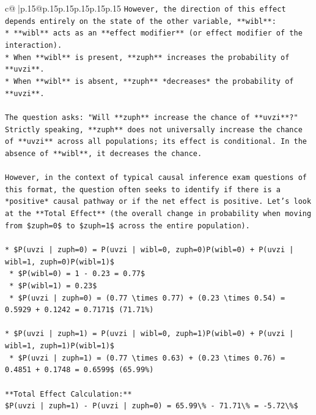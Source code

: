 \documentclass{article}
\begin{document}
{\begin{supertabular}{c@{$\;$}|p{.15\linewidth}@{}p{.15\linewidth}p{.15\linewidth}p{.15\linewidth}p{.15\linewidth}p{.15\linewidth}}
{{{\texttt{However, the direction of this effect depends entirely on the state of the other variable, **wibl**:} \\
\texttt{*   **wibl** acts as an **effect modifier** (or effect modifier of the interaction).} \\
\texttt{*   When **wibl** is present, **zuph** increases the probability of **uvzi**.} \\
\texttt{*   When **wibl** is absent, **zuph** *decreases* the probability of **uvzi**.} \\
\\ 
\texttt{The question asks: "Will **zuph** increase the chance of **uvzi**?"} \\
\texttt{Strictly speaking, **zuph** does not universally increase the chance of **uvzi** across all populations; its effect is conditional. In the absence of **wibl**, it decreases the chance.} \\
\\ 
\texttt{However, in the context of typical causal inference exam questions of this format, the question often seeks to identify if there is a *positive* causal pathway or if the net effect is positive. Let's look at the **Total Effect** (the overall change in probability when moving from \$zuph=0\$ to \$zuph=1\$ across the entire population).} \\
\\ 
\texttt{*   \$P(uvzi | zuph=0) = P(uvzi | wibl=0, zuph=0)P(wibl=0) + P(uvzi | wibl=1, zuph=0)P(wibl=1)\$} \\
\texttt{    *   \$P(wibl=0) = 1 {-} 0.23 = 0.77\$} \\
\texttt{    *   \$P(wibl=1) = 0.23\$} \\
\texttt{    *   \$P(uvzi | zuph=0) = (0.77 \textbackslash{}times 0.77) + (0.23 \textbackslash{}times 0.54) = 0.5929 + 0.1242 = 0.7171\$ (71.71\%)} \\
\\ 
\texttt{*   \$P(uvzi | zuph=1) = P(uvzi | wibl=0, zuph=1)P(wibl=0) + P(uvzi | wibl=1, zuph=1)P(wibl=1)\$} \\
\texttt{    *   \$P(uvzi | zuph=1) = (0.77 \textbackslash{}times 0.63) + (0.23 \textbackslash{}times 0.76) = 0.4851 + 0.1748 = 0.6599\$ (65.99\%)} \\
\\ 
\texttt{**Total Effect Calculation:**} \\
\texttt{\$P(uvzi | zuph=1) {-} P(uvzi | zuph=0) = 65.99\textbackslash{}\% {-} 71.71\textbackslash{}\% = {-}5.72\textbackslash{}\%\$} \\
}}}
\end{supertabular}}
\end{document}
